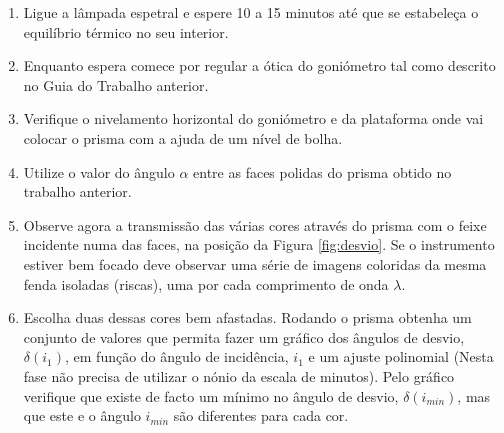 \documentclass[a4paper,12pt]{article}  %
\begin{document}
\begin{enumerate}
\item Ligue  a  lâmpada  espetral  e  espere  10  a  15  minutos    até  que  se  estabeleça  o 
equilíbrio térmico no seu interior. 
\item Enquanto espera comece por regular a ótica  do goniómetro tal como descrito no Guia do Trabalho anterior.
\item Verifique o nivelamento horizontal do goniómetro e da plataforma onde vai colocar o prisma com a ajuda de um nível de bolha. 
\item Utilize o valor do ângulo $\alpha$ entre as faces polidas do prisma obtido no trabalho anterior.
\item  Observe agora  a  transmissão  das várias cores  através  do  prisma  com  o  feixe  incidente  numa  das  faces, na posição da Figura \ref{fig:desvio}.  Se o instrumento estiver bem focado deve  observar   uma  série  de 
imagens coloridas da mesma fenda isoladas (riscas), uma por cada comprimento de onda $\lambda$.
\item Escolha duas dessas cores bem afastadas. Rodando o prisma obtenha um conjunto de valores que permita fazer um gráfico dos ângulos de desvio, $\delta(i_1)$, 
em função do ângulo de incidência, $i_1$ e um ajuste polinomial (Nesta fase não precisa de utilizar o nónio da escala de minutos). Pelo gráfico verifique que existe de facto um mínimo no ângulo de desvio,  $ \delta(i_{min})$, mas  que este e o ângulo $i_{min}$ são  diferentes para cada cor.


\end{enumerate}
\end{document}
